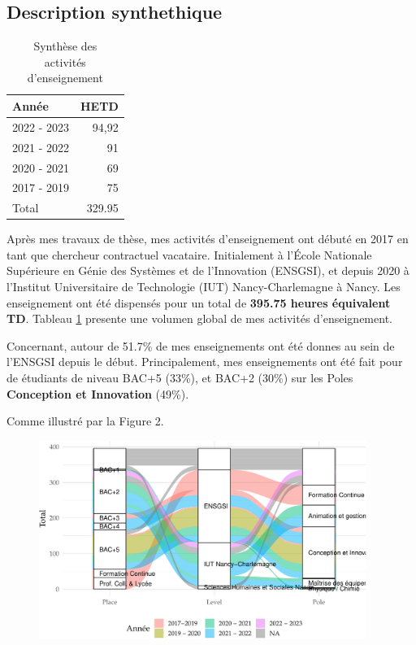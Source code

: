 \documentclass[
  11pt,
]{article}
\begin{document}
\hypertarget{description-synthethique}{%
\subsection{Description synthethique}\label{description-synthethique}}

\begin{table}
   \caption{\label{tbl-heures}Synthèse des\\activités d'enseignement}
   \begin{tabular}[t]{lr}
   \toprule
   Année & HETD\\
   \midrule
   2022 - 2023 & 94,92\\
   2021 - 2022 & 91\\
   2020 - 2021 & 69\\
   2017 - 2019 & 75\\ \midrule
   Total & 329.95 \\
   \bottomrule
   \end{tabular}
\end{table}

Après mes travaux de thèse, mes activités d'enseignement ont débuté en
2017 en tant que chercheur contractuel vacataire. Initialement à l'École
Nationale Supérieure en Génie des Systèmes et de l'Innovation (ENSGSI),
et depuis 2020 à l'Institut Universitaire de Technologie (IUT)
Nancy-Charlemagne à Nancy. Les enseignement ont été dispensés pour un
total de \textbf{395.75 heures équivalent TD}. Tableau \ref{tbl-heures}
presente une volumen global de mes activités d'enseignement.

Concernant, autour de 51.7\% de mes enseignements ont été donnes au sein
de l'ENSGSI depuis le début. Principalement, mes enseignements ont été
fait pour de étudiants de niveau BAC+5 (33\%), et BAC+2 (30\%) sur les
Poles \textbf{Conception et Innovation} (49\%).

Comme illustré par la Figure 2.

\begin{figure}[H]

{\centering \includegraphics[width=0.95\textwidth,height=\textheight]{Figures/unnamed-chunk-3-1.pdf}

}

\end{figure}
\end{document}
